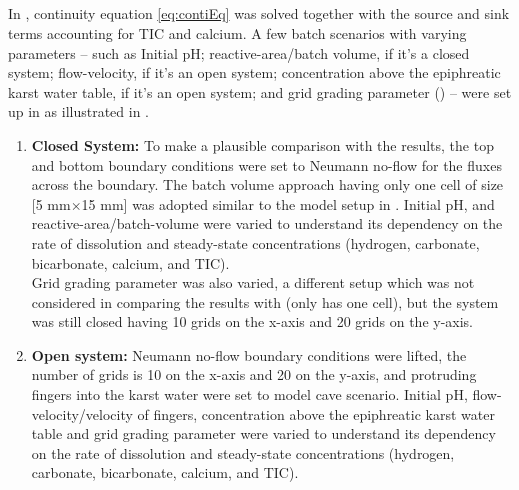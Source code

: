 \subsection{\DuMuX} \label{ssec:DumuxIntro}
In \DuMuX, continuity equation \ref{eq:contiEq} was solved together with the source and sink terms accounting for 
TIC and calcium. A few batch scenarios with varying parameters -- such as Initial pH; reactive-area/batch volume, if it's a closed system; 
flow-velocity, if it's an open system;  concentration above the epiphreatic karst water table, if it's an open system; and grid grading 
parameter () -- were set up in \DuMuX as illustrated in . 
\begin{enumerate}
    \item \textbf{Closed System:} To make a plausible comparison with the \MATLAB results, the top and bottom boundary 
    conditions were set to Neumann no-flow for the fluxes across the boundary. The batch volume approach having only 
    one cell of size [5 mm$\times$15 mm] was adopted similar to the model setup in \MATLAB. Initial pH, and reactive-area/batch-volume 
    were varied to understand its dependency on the rate of dissolution and steady-state concentrations (hydrogen, carbonate, bicarbonate, calcium, and TIC).\\
    Grid grading parameter was also varied, a different setup which was not considered in comparing the results with 
    \MATLAB (\MATLAB only has one cell), but the system was still closed having 10 grids on the x-axis and 20 grids on the y-axis. 

    \item \textbf{Open system:} Neumann no-flow boundary conditions were lifted, the number of grids is 10 on the x-axis and 20 on the y-axis, 
    and  protruding  fingers into the karst water were set to model cave scenario. Initial pH, flow-velocity/velocity of fingers,  
    concentration above the epiphreatic karst water table and grid grading parameter were varied to understand its dependency on the rate 
    of dissolution and steady-state concentrations (hydrogen, carbonate, bicarbonate, calcium, and TIC).
\end{enumerate}


